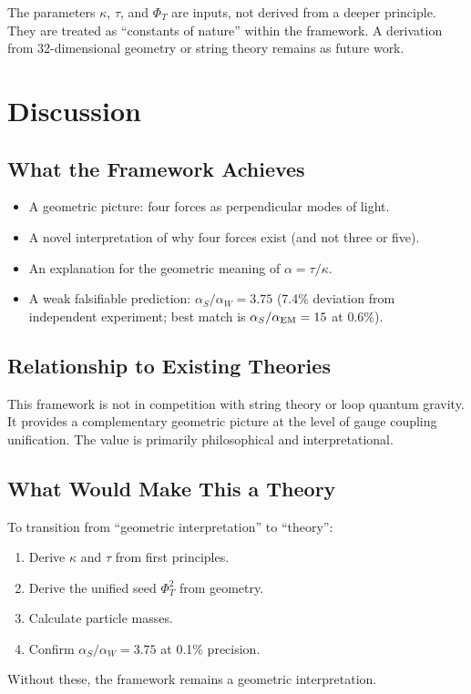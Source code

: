 \documentclass[aps,prd,10pt]{revtex4-2}
\begin{document}
The parameters $\kappa$, $\tau$, and $\Phi_T$ are inputs, not derived from a deeper
principle. They are treated as ``constants of nature'' within the framework.
A derivation from 32-dimensional geometry or string theory remains as future work.

\section{Discussion}

\subsection{What the Framework Achieves}

\begin{itemize}
\item A geometric picture: four forces as perpendicular modes of light.
\item A novel interpretation of why four forces exist (and not three or five).
\item An explanation for the geometric meaning of $\alpha = \tau/\kappa$.
\item A weak falsifiable prediction: $\alpha_S/\alpha_W = 3.75$ (7.4\% deviation from independent experiment; best match is $\alpha_S/\alpha_{\rm EM}=15$ at 0.6\%).
\end{itemize}

\subsection{Relationship to Existing Theories}

This framework is not in competition with string theory or loop quantum
gravity. It provides a complementary geometric picture at the level of
gauge coupling unification. The value is primarily philosophical and
interpretational.

\subsection{What Would Make This a Theory}

To transition from ``geometric interpretation'' to ``theory'':
\begin{enumerate}
\item Derive $\kappa$ and $\tau$ from first principles.
\item Derive the unified seed $\Phi_T^2$ from geometry.
\item Calculate particle masses.
\item Confirm $\alpha_S/\alpha_W = 3.75$ at 0.1\% precision.
\end{enumerate}
Without these, the framework remains a geometric interpretation.
\end{document}
